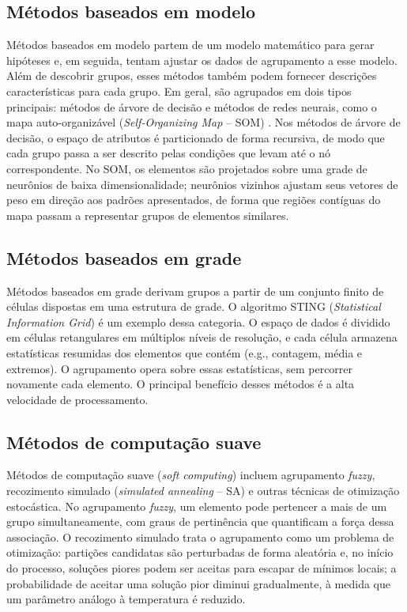 \subsection{Métodos baseados em modelo}

Métodos baseados em modelo partem de um modelo matemático para gerar hipóteses e, em seguida, tentam ajustar os dados de agrupamento a esse modelo. Além de descobrir grupos, esses métodos também podem fornecer descrições características para cada grupo. Em geral, são agrupados em dois tipos principais: métodos de árvore de decisão e métodos de redes neurais, como o mapa auto-organizável (\textit{Self-Organizing Map} -- SOM) \cite{kohonen:2013}. Nos métodos de árvore de decisão, o espaço de atributos é particionado de forma recursiva, de modo que cada grupo passa a ser descrito pelas condições que levam até o nó correspondente. No SOM, os elementos são projetados sobre uma grade de neurônios de baixa dimensionalidade; neurônios vizinhos ajustam seus vetores de peso em direção aos padrões apresentados, de forma que regiões contíguas do mapa passam a representar grupos de elementos similares.

\subsection{Métodos baseados em grade}

Métodos baseados em grade derivam grupos a partir de um conjunto finito de células dispostas em uma estrutura de grade. O algoritmo STING (\textit{Statistical Information Grid}) \cite{wang:etal:1997} é um exemplo dessa categoria. O espaço de dados é dividido em células retangulares em múltiplos níveis de resolução, e cada célula armazena estatísticas resumidas dos elementos que contém (e.g., contagem, média e extremos). O agrupamento opera sobre essas estatísticas, sem percorrer novamente cada elemento. O principal benefício desses métodos é a alta velocidade de processamento.

\subsection{Métodos de computação suave}

Métodos de computação suave (\textit{soft computing}) incluem agrupamento \textit{fuzzy}, recozimento simulado (\textit{simulated annealing} -- SA) \cite{kirkpatrick:etal:1983} e outras técnicas de otimização estocástica. No agrupamento \textit{fuzzy}, um elemento pode pertencer a mais de um grupo simultaneamente, com graus de pertinência que quantificam a força dessa associação. O recozimento simulado trata o agrupamento como um problema de otimização: partições candidatas são perturbadas de forma aleatória e, no início do processo, soluções piores podem ser aceitas para escapar de mínimos locais; a probabilidade de aceitar uma solução pior diminui gradualmente, à medida que um parâmetro análogo à temperatura é reduzido.
